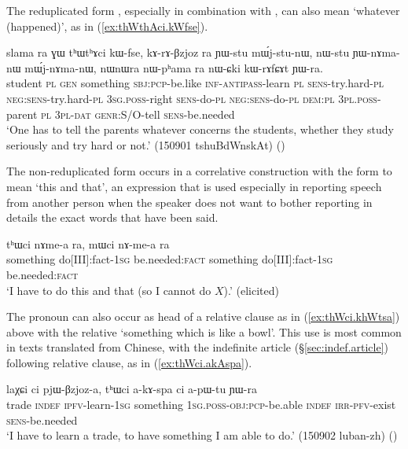 The reduplicated form , especially in combination with , can also mean `whatever (happened)', as in (\ref{ex:thWthAci.kWfse}).
 
 \begin{exe}
\ex \label{ex:thWthAci.kWfse}
\gll  slama ra ɣɯ tʰɯtʰɤci kɯ-fse, kɤ-rɤ-βzjoz ra ɲɯ-stu mɯ́j-stu-nɯ, nɯ-stu ɲɯ-nɤma-nɯ mɯ́j-nɤma-nɯ,  nɯnɯra nɯ-pʰama ra nɯ-ɕki kɯ-rɤfɕɤt ɲɯ-ra. \\
student \textsc{pl} \textsc{gen} something \textsc{sbj}:\textsc{pcp}-be.like \textsc{inf}-\textsc{antipass}-learn \textsc{pl} \textsc{sens}-try.hard-\textsc{pl} \textsc{neg}:\textsc{sens}-try.hard-\textsc{pl} \textsc{3sg}.\textsc{poss}-right \textsc{sens}-do-\textsc{pl} \textsc{neg}:\textsc{sens}-do-\textsc{pl} \textsc{dem}:\textsc{pl} \textsc{3pl}.\textsc{poss}-parent \textsc{pl} \textsc{3pl}-\textsc{dat} \textsc{genr}:S/O-tell \textsc{sens}-be.needed \\
\glt `One has to tell the parents whatever concerns the students, whether they study seriously and try hard or not.'   (150901 tshuBdWnskAt) ()
 \end{exe}
  
The non-reduplicated form  occurs in a correlative construction with the form  to mean `this and that', an expression that is used especially in reporting speech from another person when the speaker does not want to bother reporting in details the exact words that have been said.

\begin{exe}
\ex \label{ex:thWci.mWci}
\gll tʰɯci nɤme-a ra, mɯci nɤ-me-a ra \\
something do[III]:fact-\textsc{1sg} be.needed:\textsc{fact} something do[III]:fact-\textsc{1sg} be.needed:\textsc{fact} \\
\glt `I have to do this and that (so I cannot do $X$).' (elicited)
 \end{exe}
 
The pronoun   can also occur as head of a relative clause as in (\ref{ex:thWci.khWtsa}) above with the relative  `something which is like a bowl'. This use is most common in texts translated from Chinese, with the indefinite article  (§\ref{sec:indef.article}) following relative clause, as in (\ref{ex:thWci.akAspa}). 

\begin{exe}
\ex \label{ex:thWci.akAspa}
\gll  laχɕi ci pjɯ-βzjoz-a, tʰɯci a-kɤ-spa ci a-pɯ-tu ɲɯ-ra  \\
 trade \textsc{indef} \textsc{ipfv}-learn-\textsc{1sg} something \textsc{1sg}.\textsc{poss}-\textsc{obj}:\textsc{pcp}-be.able \textsc{indef} \textsc{irr}-\textsc{pfv}-exist \textsc{sens}-be.needed \\
 \glt `I have to learn a trade, to have something I am able to do.' (150902 luban-zh)
()
\end{exe}
 
